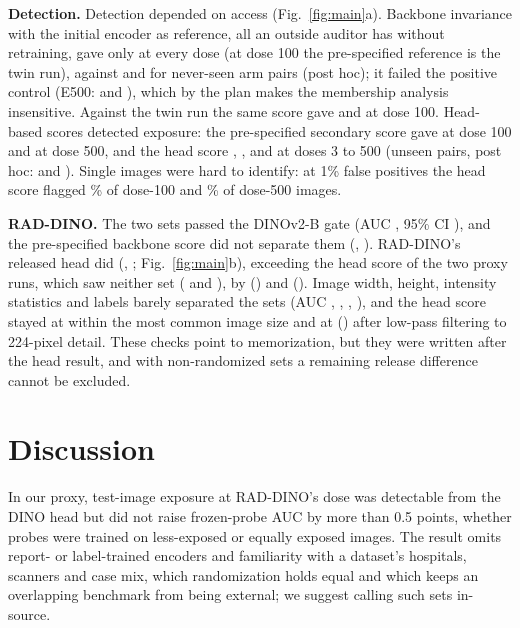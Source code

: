 \documentclass{article}
\begin{document}
\textbf{Detection.} Detection depended on access (Fig.~\ref{fig:main}a). Backbone invariance with the initial encoder as reference, all an outside auditor has without retraining, gave only \AuditorRange{} at every dose (at dose 100 the pre-specified reference is the twin run), against \NullInvOne{} and \NullInvTwo{} for never-seen arm pairs (post hoc); it failed the positive control (E500: \PosCtlOne{} and \PosCtlTwo), which by the plan makes the membership analysis insensitive. Against the twin run the same score gave \TwinOne{} and \TwinTwo{} at dose 100. Head-based scores detected exposure: the pre-specified secondary score gave \CEHundred{} at dose 100 and \CEFiveHundred{} at dose 500, and the head score \HeadThree, \HeadFifteen, \HeadHundred{} and \HeadFiveHundred{} at doses 3 to 500 (unseen pairs, post hoc: \NullHeadOne{} and \NullHeadTwo). Single images were hard to identify: at 1\% false positives the head score flagged \HeadTPRHundred\% of dose-100 and \HeadTPRFiveHundred\% of dose-500 images.

\textbf{RAD-DINO.} The two sets passed the DINOv2-B gate (AUC \GateAUC, 95\% CI \GateCI), and the pre-specified backbone score did not separate them (\RadBackbone, \RadBackboneCI). RAD-DINO's released head did (\RadHead, \RadHeadCI; Fig.~\ref{fig:main}b), exceeding the head score of the two proxy runs, which saw neither set (\CtlOne{} and \CtlTwo), by \DiffOne{} (\DiffOneCI) and \DiffTwo{} (\DiffTwoCI). Image width, height, intensity statistics and labels barely separated the sets (AUC \SizeWidth, \SizeHeight, \IntensityAUC, \LabelsAUC), and the head score stayed at \ModalAUC{} within the most common image size and at \RadHeadLow{} (\RadHeadLowCI) after low-pass filtering to 224-pixel detail. These checks point to memorization, but they were written after the head result, and with non-randomized sets a remaining release difference cannot be excluded.

\section{Discussion}\label{sec:discussion}
In our proxy, test-image exposure at RAD-DINO's dose was detectable from the DINO head but did not raise frozen-probe AUC by more than 0.5 points, whether probes were trained on less-exposed or equally exposed images. The result omits report- or label-trained encoders and familiarity with a dataset's hospitals, scanners and case mix, which randomization holds equal and which keeps an overlapping benchmark from being external; we suggest calling such sets in-source.
\end{document}
